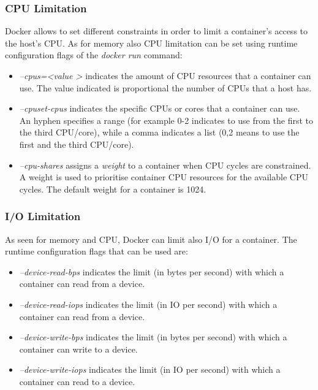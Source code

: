 \documentclass[a4paper,12pt]{article}
\begin{document}
\subsubsection{CPU Limitation} 

Docker allows to set different constraints in order to limit a container's
access to the host's CPU. As for memory also CPU limitation can be set using
runtime configuration flags of the \textit{docker run} command:
\begin{itemize}
  \item \textit{--cpus=\textless value \textgreater} indicates the amount of CPU
  resources that a container can use. The value indicated is proportional the
  number of CPUs that a host has. 
  \item \textit{--cpuset-cpus} indicates the specific CPUs or cores that a
  container can use. An hyphen specifies a range (for example 0-2 indicates to
  use from the first to the third CPU/core), while a comma indicates a list
  (0,2 means to use the first and the third CPU/core).
  \item \textit{--cpu-shares} assigns a \textit{weight} to a container  when CPU
  cycles are constrained. A weight is used to prioritise container CPU resources
  for the available CPU cycles. The default weight for a container is 1024.
\end{itemize}

\subsubsection{I/O Limitation}

As seen for memory and CPU, Docker can limit also I/O for a container. The
runtime configuration flags that can be used are: 
\begin{itemize}
  \item \textit{--device-read-bps} indicates the limit (in bytes per second)
  with which a container can read from a device.
  \item \textit{--device-read-iops} indicates the limit (in IO per second)
  with which a container can read from a device.
  \item \textit{--device-write-bps} indicates the limit (in bytes per second)
  with which a container can write to a device.
  \item \textit{--device-write-iops} indicates the limit (in IO per second)
  with which a container can read to a device.
\end{itemize}
\end{document}
